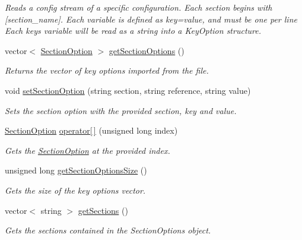 \begin{DoxyCompactItemize}
\begin{DoxyCompactList}\small\item\em Reads a config stream of a specific configuration. Each section begins with \textquotesingle{}\mbox{[}section\+\_\+name\mbox{]}\textquotesingle{}. Each variable is defined as \textquotesingle{}key=value\textquotesingle{}, and must be one per line Each key\textquotesingle{}s variable will be read as a string into a Key\+Option structure. \end{DoxyCompactList}\item 
vector$<$ \hyperlink{struct_section_option}{Section\+Option} $>$ \hyperlink{class_config_parser_a1617c529ef5a610f71bafa4078ab4d67}{get\+Section\+Options} ()
\begin{DoxyCompactList}\small\item\em Returns the vector of key options imported from the file. \end{DoxyCompactList}\item 
void \hyperlink{class_config_parser_a38623871cd3bffc661ef0dcf4e30e3dd}{set\+Section\+Option} (string section, string reference, string value)
\begin{DoxyCompactList}\small\item\em Sets the section option with the provided section, key and value. \end{DoxyCompactList}\item 
\hyperlink{struct_section_option}{Section\+Option} \hyperlink{class_config_parser_afaa00101819a70c44769c35f73143e14}{operator\mbox{[}$\,$\mbox{]}} (unsigned long index)
\begin{DoxyCompactList}\small\item\em Gets the \hyperlink{struct_section_option}{Section\+Option} at the provided index. \end{DoxyCompactList}\item 
unsigned long \hyperlink{class_config_parser_a060ab52fcfc47cc74673ea4b9898ea28}{get\+Section\+Options\+Size} ()
\begin{DoxyCompactList}\small\item\em Gets the size of the key options vector. \end{DoxyCompactList}\item 
vector$<$ string $>$ \hyperlink{class_config_parser_aa20989ac40de43a2a9ed9f40636c6d09}{get\+Sections} ()
\begin{DoxyCompactList}\small\item\em Gets the sections contained in the Section\+Options object. \end{DoxyCompactList}\item 

\end{DoxyCompactItemize}
